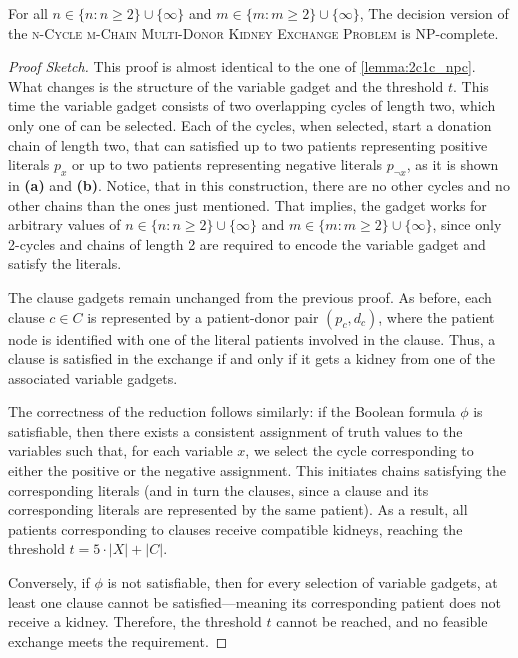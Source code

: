 \begin{lemma}
\label{lemma:ncmc_npc}
For all $n \in \{n : n \ge 2\} \cup \{\infty\}$ and $m \in \{m:m \ge 2\} \cup \{\infty\}$, The decision version of the \textsc{n-Cycle m-Chain Multi-Donor Kidney Exchange Problem} is NP-complete.

\begin{proof}[Proof Sketch]
This proof is almost identical to the one of \autoref{lemma:2c1c_npc}. What changes is the structure of the variable gadget and the threshold $t$. This time the variable gadget consists of two overlapping cycles of length two, which only one of can be selected. Each of the cycles, when selected, start a donation chain of length two, that can satisfied up to two patients representing positive literals $p_x$ or up to two patients representing negative literals $p_{\neg{x}}$, as it is shown in \textbf{(a)} and \textbf{(b)}. Notice, that in this construction, there are no other cycles and no other chains than the ones just mentioned. That implies, the gadget works for arbitrary values of $n \in \{n : n \ge 2\} \cup \{\infty\}$ and $m \in \{m : m \ge 2\} \cup \{\infty\}$, since only 2-cycles and chains of length 2 are required to encode the variable gadget and satisfy the literals.

The clause gadgets remain unchanged from the previous proof. As before, each clause $c \in C$ is represented by a patient-donor pair $(p_c, d_c)$, where the patient node is identified with one of the literal patients involved in the clause. Thus, a clause is satisfied in the exchange if and only if it gets a  kidney from one of the associated variable gadgets.

The correctness of the reduction follows similarly: if the Boolean formula $\phi$ is satisfiable, then there exists a consistent assignment of truth values to the variables such that, for each variable $x$, we select the cycle corresponding to either the positive or the negative assignment. This initiates chains satisfying the corresponding literals (and in turn the clauses, since a clause and its corresponding literals are represented by the same patient). As a result, all patients corresponding to clauses receive compatible kidneys, reaching the threshold $t = 5 \cdot |X| + |C|$.

Conversely, if $\phi$ is not satisfiable, then for every selection of variable gadgets, at least one clause cannot be satisfied—meaning its corresponding patient does not receive a kidney. Therefore, the threshold $t$ cannot be reached, and no feasible exchange meets the requirement.


\end{proof}
\end{lemma}
